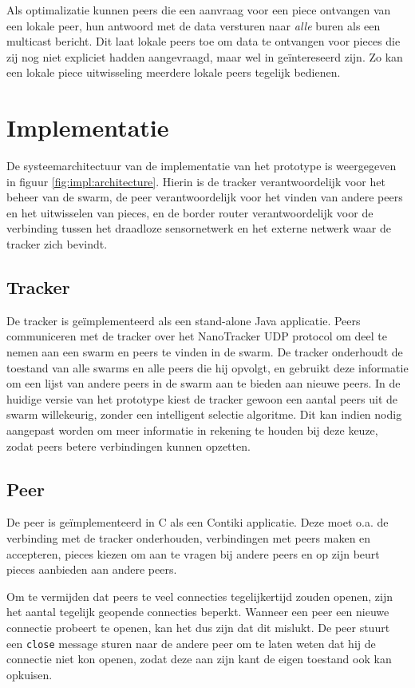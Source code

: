 \documentclass[journal]{IEEEtran}
\begin{document}
Als optimalizatie kunnen peers die een aanvraag voor een piece ontvangen van een lokale peer, hun antwoord met de data versturen naar \emph{alle} buren als een multicast bericht. Dit laat lokale peers toe om data te ontvangen voor pieces die zij nog niet expliciet hadden aangevraagd, maar wel in ge\"intereseerd zijn. Zo kan een lokale piece uitwisseling meerdere lokale peers tegelijk bedienen.

\section{Implementatie}
\label{sec:implementatie}
De systeemarchitectuur van de implementatie van het prototype is weergegeven in figuur \ref{fig:impl:architecture}. Hierin is de tracker verantwoordelijk voor het beheer van de swarm, de peer verantwoordelijk voor het vinden van andere peers en het uitwisselen van pieces, en de border router verantwoordelijk voor de verbinding tussen het draadloze sensornetwerk en het externe netwerk waar de tracker zich bevindt.

\subsection{Tracker}
De tracker is ge\"implementeerd als een stand-alone Java applicatie. Peers communiceren met de tracker over het NanoTracker UDP protocol om deel te nemen aan een swarm en peers te vinden in de swarm. De tracker onderhoudt de toestand van alle swarms en alle peers die hij opvolgt, en gebruikt deze informatie om een lijst van andere peers in de swarm aan te bieden aan nieuwe peers. In de huidige versie van het prototype kiest de tracker gewoon een aantal peers uit de swarm willekeurig, zonder een intelligent selectie algoritme. Dit kan indien nodig aangepast worden om meer informatie in rekening te houden bij deze keuze, zodat peers betere verbindingen kunnen opzetten.

\subsection{Peer}
De peer is ge\"implementeerd in C als een Contiki \cite{contiki} applicatie. Deze moet o.a. de verbinding met de tracker onderhouden, verbindingen met peers maken en accepteren, pieces kiezen om aan te vragen bij andere peers en op zijn beurt pieces aanbieden aan andere peers.

Om te vermijden dat peers te veel connecties tegelijkertijd zouden openen, zijn het aantal tegelijk geopende connecties beperkt. Wanneer een peer een nieuwe connectie probeert te openen, kan het dus zijn dat dit mislukt. De peer stuurt een \texttt{close} message sturen naar de andere peer om te laten weten dat hij de connectie niet kon openen, zodat deze aan zijn kant de eigen toestand ook kan opkuisen.
\end{document}
